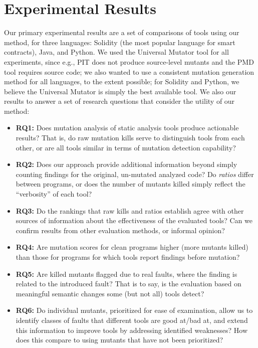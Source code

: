 \section{Experimental Results}

Our primary experimental results are a set of comparisons of tools using our method, for three languages: Solidity (the most popular language for smart contracts), Java, and Python.  We used the Universal Mutator tool for all experiments, since e.g., PIT \cite{pitmut} does not produce source-level mutants and the PMD tool requires source code; we also wanted to use a consistent mutation generation method for all languages, to the extent possible; for Solidity and Python, we believe the Universal Mutator is simply the best available tool.   We also our results to answer a set of research questions that consider the utility of our method:

\begin{itemize}
\item {\bf RQ1:}  Does mutation analysis of static analysis tools produce actionable results?  That is, do raw mutation kills serve to distinguish tools from each other, or are all tools similar in terms of mutation detection capability?
\item {\bf RQ2:}  Does our approach provide additional information beyond simply counting findings for the original, un-mutated analyzed code?  Do \emph{ratios} differ between programs, or does the number of mutants killed simply reflect the ``verbosity'' of each tool?
\item {\bf RQ3:}  Do the rankings that raw kills and ratios establish agree with other sources of information about the effectiveness of the evaluated tools?  Can we confirm results from other evaluation methods, or informal opinion?
\item {\bf RQ4:}  Are mutation scores for clean programs higher (more mutants killed) than those for programs for which tools report findings before mutation?
\item {\bf RQ5:}  Are killed mutants flagged due to real faults, where the finding is related to the introduced fault?  That is to say, is the evaluation based on meaningful semantic changes some (but not all) tools detect?
\item {\bf RQ6:}  Do individual mutants, prioritized for ease of examination, allow us to identify classes of faults that
 different tools are good at/bad at, and extend this information to improve tools by addressing identified weaknesses?  How does this compare to using mutants that have not been prioritized?
  \end{itemize}

